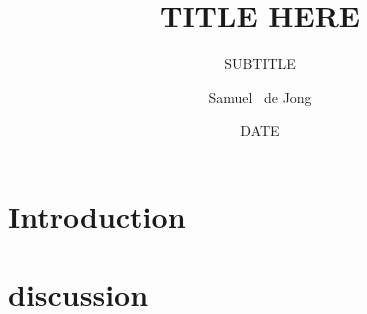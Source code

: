 \newcommand\collabImageLarge{/hepuser/srdejong/Pictures/ATLAS_logo}
\newcommand\collabImageSmall{/hepuser/srdejong/Pictures/ATLAS_logo_small_white}


\title
{TITLE HERE}

\subtitle
{SUBTITLE}

\author[Samuel de Jong]
{Samuel ~de Jong}



\date
{DATE}

\subject{SUBJECT}




\begin{frame}
  \titlepage
\end{frame}

\newcommand*\oldmacro{}%
\let\oldmacro\insertshorttitle%
\renewcommand*\insertshorttitle{%
\vspace{-0.05cm}
\texttt{[image: /hepuser/srdejong/Pictures/ATLAS\_logo\_small\_white]}
\hspace{0.15cm}
\oldmacro%
\hspace{0.15cm}
\texttt{[image: /hepuser/srdejong/Pictures/UVic\_Shield]}
}




\section{Introduction}


\begin{frame}{\secname} %

\end{frame}


\section{discussion}

